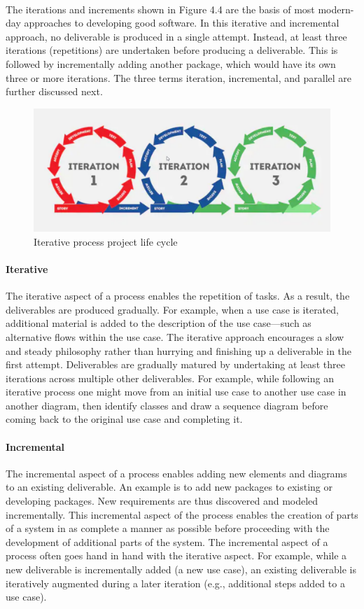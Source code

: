 \paragraph*{}
The iterations and increments shown in Figure 4.4 are the basis of most modern-day approaches to developing good software. In this iterative and incremental approach, no deliverable is produced in a single attempt. Instead, at least three iterations (repetitions) are undertaken before producing a deliverable.
This is followed by incrementally adding another package, which would have its own three or more iterations. The three terms iteration, incremental, and parallel are further discussed next.
\begin{figure}[!ht]
      \center
      \includegraphics[scale=0.40]{assets/iteration.png}
      \caption{Iterative process project life cycle}
      \label{fig:iterationlifecycle}
\end{figure}
\paragraph*{Iterative}
The iterative aspect of a process enables the repetition of tasks. As a result, the deliverables are produced gradually. For example, when a use case is iterated, additional material is added to the description of the use case—such as alternative flows within the use case. The iterative approach encourages a slow and steady philosophy rather than hurrying and finishing up a deliverable in the first attempt.
Deliverables are gradually matured by undertaking at least three iterations across multiple other deliverables. For example, while following an iterative process one might move from an initial use case to another use case in another diagram, then identify classes and draw a sequence diagram before coming back to the original use case and completing it.
\paragraph*{Incremental}
The incremental aspect of a process enables adding new elements and diagrams to an existing deliverable. An example is to add new packages to existing or developing packages. New requirements are thus discovered and modeled incrementally. This incremental aspect of the process enables the creation of parts of a system in as complete a manner as possible before proceeding with the development of additional parts of the system. The incremental aspect of a process often goes hand in hand with the iterative aspect. For example, while a new deliverable is incrementally added (a new use case), an existing deliverable is iteratively augmented during a later iteration (e.g., additional steps added to a use case).
\clearpage

